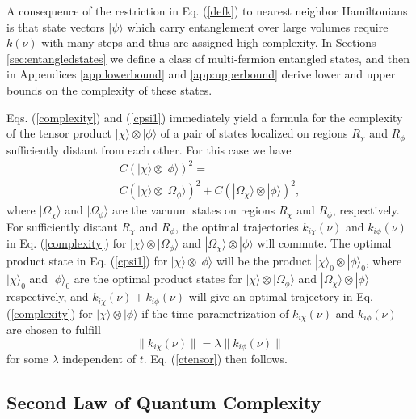 \documentclass[12pt,amsmath,amssymb,onecolumn]{revtex4-2}
\begin{document}
A consequence of the restriction in Eq. (\ref{defk}) to nearest neighbor Hamiltonians is
that state vectors $|\psi \rangle $ which carry entanglement over large volumes
require $k(\nu)$ with many steps and thus
are assigned high complexity.  
In Sections \ref{sec:entangledstates} we define a class of 
multi-fermion entangled states, and then in
Appendices \ref{app:lowerbound} and \ref{app:upperbound} 
derive lower and upper bounds on the complexity of these states.

Eqs. (\ref{complexity}) and (\ref{cpsi1}) immediately yield 
a formula for the complexity of the tensor product $|\chi \rangle  \otimes |\phi \rangle $ of a pair of states
localized on regions $R_{\chi}$ and $R_{\phi}$ sufficiently distant from each other. 
For this case we have
\begin{multline}
\label{ctensor}
C( |\chi \rangle  \otimes |\phi \rangle )^2 = \\
C( |\chi \rangle  \otimes |\Omega_{\phi} \rangle  )^2 + C( |\Omega_{\chi} \rangle  \otimes |\phi \rangle )^2,
\end{multline}
where $|\Omega_{\chi} \rangle $ and $|\Omega_{\phi} \rangle $ are the vacuum states on regions $R_{\chi}$
and $R_{\phi}$, respectively. For sufficiently 
distant $R_{\chi}$ and $R_{\phi}$, the optimal trajectories 
$k_{i\chi}(\nu)$ and $k_{i\phi}(\nu)$
in Eq. (\ref{complexity})
for  $|\chi \rangle  \otimes |\Omega_{\phi} \rangle $ and $|\Omega_{\chi} \rangle  \otimes |\phi \rangle $
will commute. The optimal product state in 
Eq. (\ref{cpsi1}) for $|\chi \rangle  \otimes |\phi \rangle $ will be the product
$|\chi \rangle _0 \otimes |\phi \rangle _0$, where $|\chi \rangle _0$ and $|\phi \rangle _0$
are the optimal product states for $|\chi \rangle  \otimes |\Omega_{\phi} \rangle $ and $|\Omega_{\chi} \rangle  \otimes |\phi \rangle $
respectively, and
$k_{i\chi}(\nu) + k_{i\phi}(\nu)$ will give
an optimal trajectory in Eq. (\ref{complexity}) for $|\chi \rangle  \otimes |\phi \rangle $ if the
time parametrization of 
$k_{i\chi}(\nu)$ and $k_{i\phi}(\nu)$ are chosen to fulfill
\begin{equation}
\label{fixedratio}
\parallel k_{i\chi}(\nu)\parallel = \lambda \parallel k_{i\phi}(\nu)\parallel
\end{equation}
for some $\lambda$ independent of $t$.
Eq. (\ref{ctensor}) then follows.


\subsection{\label{subsec:secondlaw} Second Law of Quantum Complexity}
\end{document}
